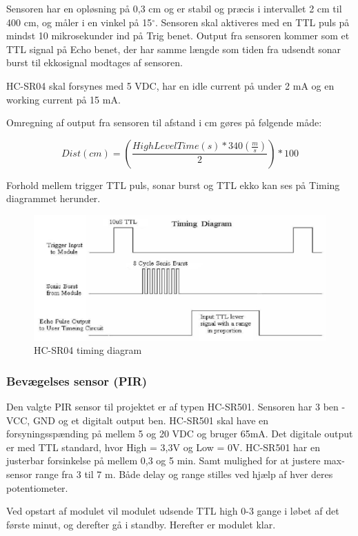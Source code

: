 Sensoren har en opløsning på 0,3 cm og er stabil og præcis i intervallet 2 cm til 400 cm, og måler i en vinkel på 15$^{\circ}$. Sensoren skal aktiveres med en TTL puls på mindst 10 mikrosekunder ind på Trig benet. Output fra sensoren kommer som et TTL signal på Echo benet, der har samme længde som tiden fra udsendt sonar burst til ekkosignal modtages af sensoren.

HC-SR04 skal forsynes med 5 VDC, har en idle current på under 2 mA og en working current på 15 mA.

Omregning af output fra sensoren til afstand i cm gøres på følgende måde:

$$Dist(cm) = (\frac{HighLevelTime(s)*340(\frac{m}{s})}{2})*100$$

Forhold mellem trigger TTL puls, sonar burst og TTL ekko kan ses på Timing diagrammet herunder.

\begin{figure}[H] \centering
    \includegraphics[width=\linewidth]{0_Filer/Figuer/5_HW_Design/HC-SR04_Ultra_Sonic_Timing_Diagram.PNG}
    \caption{HC-SR04 timing diagram}
    \label{fig:HWD_SR04_timing}
\end{figure}

\subsubsection{Bevægelses sensor (PIR)}

Den valgte PIR sensor til projektet er af typen HC-SR501. Sensoren har 3 ben -  VCC, GND og et digitalt output ben. HC-SR501 skal have en forsyningsspænding på mellem 5 og 20 VDC og bruger 65mA. Det digitale output er med TTL standard, hvor High = 3,3V og Low = 0V. HC-SR501 har en justerbar forsinkelse på mellem 0,3 og 5 min. Samt mulighed for at justere max-sensor range fra 3 til 7 m. Både delay og range stilles ved hjælp af hver deres potentiometer.

Ved opstart af modulet vil modulet udsende TTL high 0-3 gange i løbet af det første minut, og derefter gå i standby. Herefter er modulet klar.

